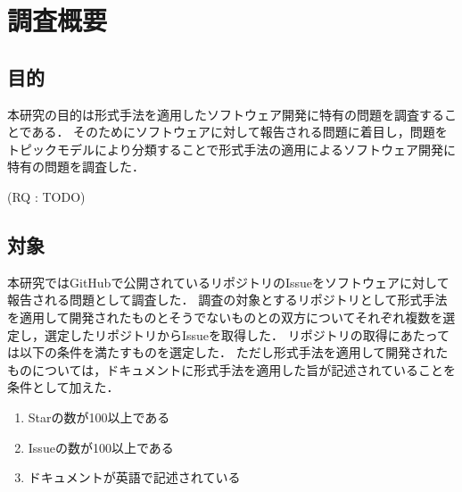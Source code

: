 \documentclass[main]{subfiles}
\begin{document}
\chapter{調査概要}

\section{目的}

本研究の目的は形式手法を適用したソフトウェア開発に特有の問題を調査することである．
そのためにソフトウェアに対して報告される問題に着目し，問題をトピックモデルにより分類することで形式手法の適用によるソフトウェア開発に特有の問題を調査した．

(RQ : TODO)

\section{対象}

本研究ではGitHubで公開されているリポジトリのIssueをソフトウェアに対して報告される問題として調査した．
調査の対象とするリポジトリとして形式手法を適用して開発されたものとそうでないものとの双方についてそれぞれ複数を選定し，選定したリポジトリからIssueを取得した．
リポジトリの取得にあたっては以下の条件を満たすものを選定した．
ただし形式手法を適用して開発されたものについては，ドキュメントに形式手法を適用した旨が記述されていることを条件として加えた．

\begin{enumerate}
	\item Starの数が100以上である
	\item Issueの数が100以上である
	\item ドキュメントが英語で記述されている
\end{enumerate}
\end{document}
